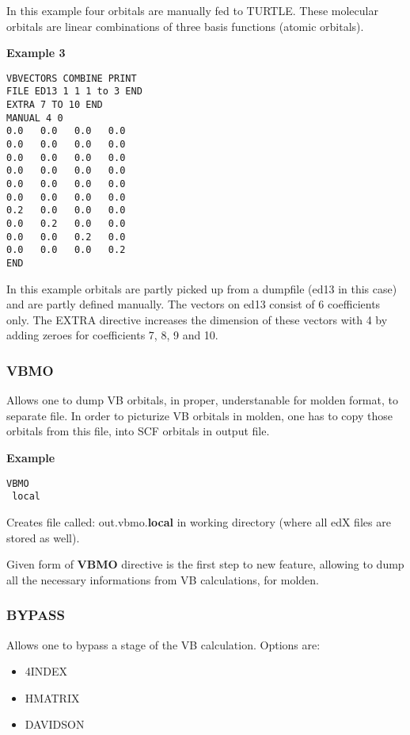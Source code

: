 \documentclass[11pt,fleqn]{article}
\begin{document}
In this example four orbitals are manually fed to TURTLE. These molecular orbitals are
linear combinations of three basis functions (atomic orbitals). 

{\bf Example 3 }
\begin{verbatim}
VBVECTORS COMBINE PRINT
FILE ED13 1 1 1 to 3 END
EXTRA 7 TO 10 END
MANUAL 4 0
0.0   0.0   0.0   0.0
0.0   0.0   0.0   0.0
0.0   0.0   0.0   0.0
0.0   0.0   0.0   0.0
0.0   0.0   0.0   0.0
0.0   0.0   0.0   0.0
0.2   0.0   0.0   0.0
0.0   0.2   0.0   0.0
0.0   0.0   0.2   0.0
0.0   0.0   0.0   0.2
END
\end{verbatim}

In this example orbitals are partly picked up from a dumpfile (ed13 in this case) and are partly defined manually. The vectors on ed13 consist of 6 coefficients only. The EXTRA directive increases the dimension of these vectors with 4 by adding zeroes for coefficients 7, 8, 9 and 10. 

\subsubsection{VBMO}

Allows one to dump VB orbitals, in proper, understanable for molden format, to separate file. In order to
picturize VB orbitals in molden, one has to copy those orbitals from this file, into SCF orbitals in output file.

{\bf Example}
\begin{verbatim}
VBMO
 local
\end{verbatim}

Creates file called: out.vbmo.{\bf local} in working directory (where all edX files are stored as well).

Given form of {\bf VBMO} directive is the first step to new feature, allowing to dump all the necessary informations
from VB calculations, for molden.

\subsubsection{BYPASS}

Allows one to bypass a stage of the VB calculation. Options are:

\begin{itemize}
\item 4INDEX
\item HMATRIX
\item DAVIDSON
\end{itemize}
\end{document}
